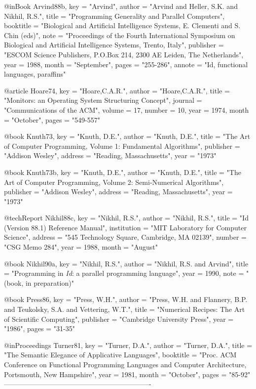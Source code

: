 @inBook{
    Arvind88b,
    key = "Arvind",
    author = "Arvind and Heller, S.K. and Nikhil, R.S.",
    title = "{Programming Generality and Parallel Computers}",
    booktitle = "Biological and Artificial Intelligence Systems,
                 E. Clementi and S. Chin (eds)",
    note = "Proceedings of the Fourth International Symposium on Biological and
            Artificial Intelligence Systems, Trento, Italy",
    publisher = "ESCOM Science Publishers, P.O.Box 214, 2300 AE Leiden, The Netherlands",
    year = 1988,
    month = "September",
    pages = "255-286",
    annote = "Id, functional languages, paraffins"
}

@article{
    Hoare74,
    key = "Hoare,C.A.R.",
    author = "Hoare,C.A.R.",
    title = "Monitors: an Operating System Structuring Concept",
    journal = "Communications of the ACM",
    volume = 17,
    number = 10,
    year = 1974,
    month = "October",
    pages = "549-557"
}

@book{
    Knuth73,
    key = "Knuth, D.E.",
    author = "Knuth, D.E.",
    title = "The Art of Computer Programming, Volume 1: Fundamental Algorithms",
    publisher = "Addison Wesley",
    address = "Reading, Massachusetts",
    year = "1973"
}

@book{
    Knuth73b,
    key = "Knuth, D.E.",
    author = "Knuth, D.E.",
    title = "The Art of Computer Programming, Volume 2: Semi-Numerical Algorithms",
    publisher = "Addison Wesley",
    address = "Reading, Massachusetts",
    year = "1973"
}

@techReport{
    Nikhil88c,
    key = "Nikhil, R.S.",
    author = "Nikhil, R.S.",
    title = "{Id (Version 88.1) Reference Manual}",
    institution = "MIT Laboratory for Computer Science",
    address = "545 Technology Square, Cambridge, MA 02139",
    number = "CSG Memo 284",
    year = 1988,
    month = "August"
}

@book{
    Nikhil90a,
    key = "Nikhil, R.S.",
    author = "Nikhil, R.S. and Arvind",
    title = "{Programming in {\it Id\/}: a parallel programming language}",
    year = 1990,
    note = "(book, in preparation)"
}

@book{
    Press86,
    key = "Press, W.H.",
    author = "Press, W.H. and Flannery, B.P. and Teukolsky, S.A. and Vettering, W.T.",
    title = "{Numerical Recipes: The Art of Scientific Computing}",
    publisher = "Cambridge University Press",
    year = "1986",
    pages = "31-35"
}

@inProceedings{
    Turner81,
    key = "Turner, D.A.",
    author = "Turner, D.A.",
    title = "The Semantic Elegance of Applicative Languages",
    booktitle = "Proc. ACM Conference on Functional Programming Languages
                 and Computer Architecture, Portsmouth, New Hampshire",
    year = 1981,
    month = "October",
    pages = "85-92"
}
----------------------------------------------------------------

